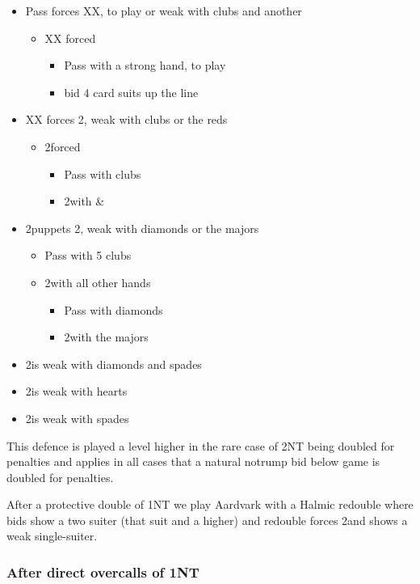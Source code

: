 \documentclass[a4paper,14pt]{extarticle}
\begin{document}
\begin{itemize}
\item Pass forces XX, to play or weak with clubs and another
	\begin{itemize}
	\item XX forced
		\begin{itemize}
		\item Pass with a strong hand, to play
		\item bid 4 card suits up the line
		\end{itemize}
	\end{itemize}
\item XX forces 2\clubs, weak with clubs or the reds
	\begin{itemize}
	\item 2\clubs forced
		\begin{itemize}
		\item Pass with clubs
		\item 2\diamonds with \diamonds\&\hearts
		\end{itemize}
	\end{itemize}
\item 2\clubs puppets 2\diamonds, weak with diamonds or the majors
	\begin{itemize}
	\item Pass with 5 clubs
	\item 2\diamonds with all other hands
		\begin{itemize}
		\item Pass with diamonds
		\item 2\hearts with the majors
		\end{itemize}
	\end{itemize}
\item 2\diamonds is weak with diamonds and spades
\item 2\hearts is weak with hearts
\item 2\spades is weak with spades
\end{itemize}

This defence is played a level higher in the rare case of 2NT being doubled for
penalties and applies in all cases that a natural notrump bid below game is doubled for
penalties.

\label{note:21}

After a protective double of 1NT we play Aardvark with a Halmic redouble where
bids show a two suiter (that suit and a higher) and redouble forces 2\clubs and shows a weak single-suiter.

\subsubsection{After direct overcalls of 1NT}
\label{sec:resp:lebensohl}
\label{note:12}
\end{document}
